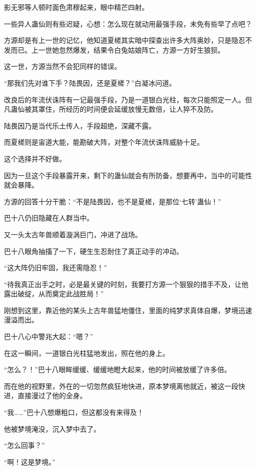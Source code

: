 
\begin{this_body}

影无邪等人顿时面色肃穆起来，眼中精芒四射。

一些异人蛊仙则有些迟疑，心想：怎么现在就动用最强手段，未免有些早了点吧？

方源却是有上一世的记忆，他知道夏槎其实暗中探查出许多大阵奥妙，只是隐忍不发而已。上一世她忽然爆发，结果令白兔姑娘阵亡，方源一方好生狼狈。

这一世，方源当然不会犯同样的错误。

“那我们先对谁下手？陆畏因，还是夏槎？”白凝冰问道。

改良后的年流伏诛阵有一记最强手段，乃是一道银白光柱，每次只能照定一人。但凡蛊仙被其罩住，所经历的时间便会延缓放慢无数倍，让人猝不及防。

陆畏因乃是当代乐土传人，手段超绝，深藏不露。

而夏槎则是宙道大能，能勘破大阵，对整个年流伏诛阵威胁十足。

这个选择并不好做。

因为一旦这个手段暴露开来，剩下的蛊仙就会有所防备，想要再中，当中的可能性就会暴降。

方源的回答十分干脆：“不是陆畏因，也不是夏槎，是那位‘七转’蛊仙！”

巴十八仍旧隐藏在人群当中。

又一头太古年兽顺着漩涡巨门，冲进了战场。

巴十八眼角抽搐了一下，硬生生忍耐住了真正动手的冲动。

“这大阵仍旧牢固，我还需隐忍！”

“待我真正出手之时，必是最关键的时刻，我要打方源一个狠狠的措手不及，让他露出破绽，从而奠定此战胜局！”

刚想到这里，靠近他的某头上古年兽猛地僵住，里面的纯梦求真体自爆，梦境迅速漫溢而出。

巴十八心中警兆大起：“嗯？”

在这一瞬间，一道银白光柱猛地发出，照在他的身上。

“怎么？！”巴十八眼眸缓缓、缓缓地瞪大起来，他的时间被放缓了许多倍。

而在他的视野里，外在的一切忽然疯狂地快进，原本梦境离他就近，被这一段快进，直接漫过了他的全身。

“我……”巴十八想爆粗口，但这都没有来得及！

他被梦境淹没，沉入梦中去了。

“怎么回事？”

“啊！这是梦境。”


\end{this_body}
